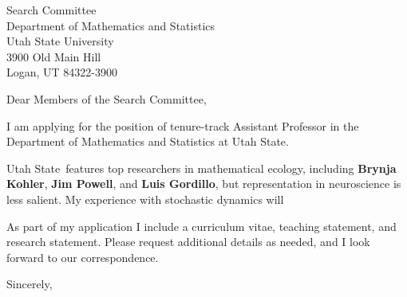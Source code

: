 \documentclass[11pt,a4paper]{letter}
\begin{document}

\def\School{Utah State}

\begin{letter}
{Search Committee\\
Department of Mathematics and Statistics\\
Utah State University\\
3900 Old Main Hill\\
Logan, UT 84322-3900
}


\opening{Dear Members of the Search Committee,}

I am applying for the position of tenure-track Assistant Professor in the Department of Mathematics and Statistics at \School. 



\School~features top researchers in mathematical ecology, including \textbf{Brynja Kohler}, \textbf{Jim Powell}, and \textbf{Luis Gordillo}, but representation in neuroscience is less salient. My experience with stochastic dynamics will 



As part of my application I include a curriculum vitae, teaching statement, and research statement. Please request additional details as needed, and I look forward to our correspondence.

\closing{Sincerely,}
\end{letter}
\end{document}
